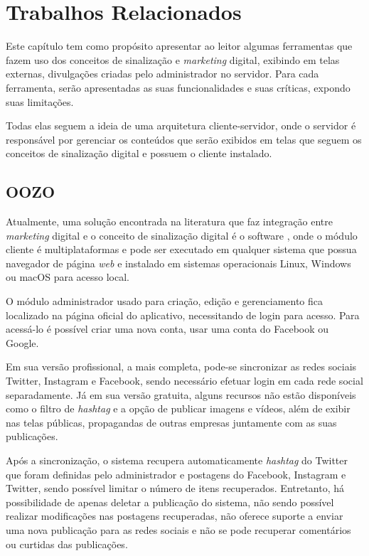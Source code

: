 \chapter[Trabalhos Relacionados]{Trabalhos Relacionados}
\label{relacionados}
Este capítulo tem como propósito apresentar ao leitor algumas ferramentas que fazem uso dos conceitos de sinalização e \textit{marketing} digital, exibindo em telas externas, divulgações criadas pelo administrador no servidor. Para cada ferramenta, serão apresentadas as suas funcionalidades e suas críticas, expondo suas limitações.

Todas elas seguem a ideia de uma arquitetura cliente-servidor, onde o servidor é responsável por gerenciar os conteúdos que serão exibidos em telas que seguem os conceitos de sinalização digital e possuem o cliente instalado.

\section{OOZO}
\label{sec:oozo}
Atualmente, uma solução encontrada na literatura que faz integração entre \textit{marketing} digital e o conceito de sinalização digital é o software \cite{oozo2017}, onde o módulo cliente é multiplataformas e pode ser executado em qualquer sistema que possua navegador de página \textit{web} e instalado em sistemas operacionais Linux, Windows ou macOS para acesso local.

O módulo administrador usado para criação, edição e gerenciamento fica localizado na página oficial do aplicativo, necessitando de login para acesso. Para acessá-lo é possível criar uma nova conta, usar uma conta do Facebook ou Google. 

Em sua versão profissional, a mais completa, pode-se sincronizar as redes sociais Twitter, Instagram e Facebook, sendo necessário efetuar login em cada rede social separadamente. Já em sua versão gratuita, alguns recursos não estão disponíveis como o filtro de \textit{hashtag} e a opção de publicar imagens e vídeos, além de exibir nas telas públicas, propagandas de outras empresas juntamente com as suas publicações. 

Após a sincronização, o sistema recupera automaticamente \textit{hashtag} do Twitter que foram definidas pelo administrador e postagens do Facebook, Instagram e Twitter, sendo possível limitar o número de itens recuperados. Entretanto, há possibilidade de apenas deletar a publicação do sistema, não sendo possível realizar modificações nas postagens recuperadas, não oferece suporte a enviar uma nova publicação para as redes sociais e não se pode recuperar comentários ou curtidas das publicações.

